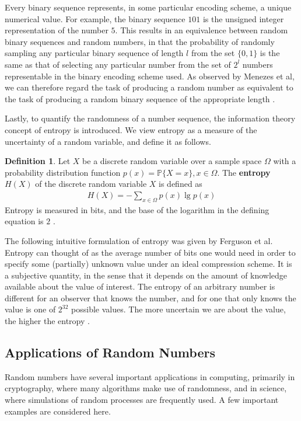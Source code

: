 \documentclass[12pt, titlepage]{report}
\theoremstyle{definition}
\newtheorem{definition}{Definition}
\begin{document}
Every binary sequence represents, in some particular encoding scheme, a unique numerical value. For example, the binary sequence $101$ is the unsigned integer representation of the number $5$. This results in an equivalence between random binary sequences and random numbers, in that the probability of randomly sampling any particular binary sequence of length $l$ from the set $\{0, 1\}$ is the same as that of selecting any particular number from the set of $2^l$ numbers representable in the binary encoding scheme used. As observed by Menezes et al, we can therefore regard the task of producing a random number as equivalent to the task of producing a random binary sequence of the appropriate length \cite[p. 170]{menezes1996handbook}.

Lastly, to quantify the randomness of a number sequence, the information theory concept of entropy is introduced. We view entropy as a measure of the uncertainty of a random variable, and define it as follows.

\begin{definition}
Let $X$ be a discrete random variable over a sample space $\Omega$ with a probability distribution function $p(x)=\mathbb{P}\{X=x\}, x\in\Omega$.  The \textbf{entropy} $H(X)$ of the discrete random variable $X$ is defined as
\begin{gather}\label{eq:entropy}
H(X) = -\sum_{x\in\Omega} p(x) \lg p(x)
\end{gather}
Entropy is measured in bits, and the base of the logarithm in the defining equation is $2$ \cite[p. 12-13]{cover2012elements}.
\end{definition}

The following intuitive formulation of entropy was given by Ferguson et al. Entropy can thought of as the average number of bits one would need in order to specify some (partially) unknown value under an ideal compression scheme. It is a subjective quantity, in the sense that it depends on the amount of knowledge available about the value of interest. The entropy of an arbitrary number is different for an observer that knows the number, and for one that only knows the value is one of $2^32$ possible values. The more uncertain we are about the value, the higher the entropy \cite[p. 137]{ferguson2010cryptography}.



\subsection{Applications of Random Numbers}
Random numbers have several important applications in computing, primarily in cryptography, where many algorithms make use of randomness, \cite[p. 137]{ ferguson2010cryptography} and in science, where simulations of random processes are frequently used\cite{deng2017developments}. A few important examples are considered here.
\end{document}
